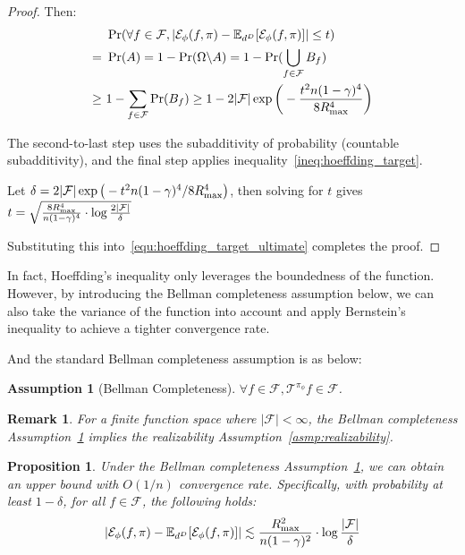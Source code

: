 \documentclass[twoside]{article}
\newtheorem{proposition}{Proposition}
\newtheorem{assumption}{Assumption}
\newtheorem{remark}{Remark}
\newcommand{\CAL}[1]{\mathcal{#1}}
\begin{document}
\begin{proof}
Then:
\begin{align}
&\ \Pr(\forall f\in\CAL{F}, |\mathcal{E}_\phi(f,\pi)-\mathbb{E}_{d^{D}}[\mathcal{E}_\phi(f,\pi)]|\leq t)\nonumber\\
        =&\ \Pr(A)\nonumber
        = 1-\Pr(\Omega\backslash A)
        = 1-\Pr(\bigcup_{f\in\CAL{F}}B_f)\\
        \geq&\ 1-\sum_{f\in\CAL{F}}\Pr(B_f)
        \geq 1-2|\CAL{F}|\exp \bigg(-\frac{t^2n(1-\gamma)^4}{8R_{\rm max}^4}\bigg)
\end{align}

The second-to-last step uses the subadditivity of probability (countable subadditivity), and the final step applies inequality~\eqref{ineq:hoeffding_target}.

Let $\delta = 2|\CAL{F}|\exp \big(-{t^2n(1-\gamma)^4}/{8R_{\rm max}^4}\big)$, then solving for $t$ gives $t = \sqrt{\frac{8R_{\rm max}^4}{n(1-\gamma)^4}\cdot\log\frac{2|\CAL{F}|}{\delta}}$

Substituting this into~\eqref{equ:hoeffding_target_ultimate} completes the proof.
\end{proof}

In fact, Hoeffding's inequality only leverages the boundedness of the function. However, by introducing the Bellman completeness assumption below, we can also take the variance of the function into account and apply Bernstein's inequality to achieve a tighter convergence rate.


And the standard Bellman completeness assumption is as below:
\begin{assumption}[Bellman Completeness]\label{asmp:bellman_completeness}
 $\forall f\in\mathcal{F}, \mathcal{T}^{\pi_\phi} f\in\mathcal{F}$.
\end{assumption}

\begin{remark}
For a finite function space where $|\CAL{F}| < \infty$, the Bellman completeness Assumption~\ref{asmp:bellman_completeness} implies the realizability Assumption~\ref{asmp:realizability}.
\end{remark}
\begin{proposition}\label{prop:bernstein_result}
Under the Bellman completeness Assumption~\ref{asmp:bellman_completeness}, we can obtain an upper bound with $O(1/n)$ convergence rate. Specifically, with probability at least $1 - \delta$, for all $f \in \CAL{F}$, the following holds:
\begin{align}
|\mathcal{E}_\phi(f,\pi)-\mathbb{E}_{d^{D}}[\mathcal{E}_\phi(f,\pi)]|\lesssim \frac{R_{\rm max}^2}{n(1-\gamma)^2}\cdot\log\frac{|\mathcal{F}|}{\delta}
\end{align}
\end{proposition}
\end{document}
